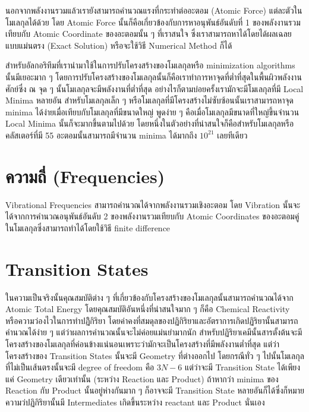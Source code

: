 นอกจากพลังงานรวมแล้วเรายังสามารถคำนวณแรงที่กระทำต่ออะตอม (Atomic Force) แต่ละตัวในโมเลกุลได้ด้วย 
โดย Atomic Force นั้นก็คือเกี่ยวข้องกับการหาอนุพันธ์อันดับที่ 1 ของพลังงานรวมเทียบกับ Atomic Coordinate 
ของอะตอมนั้น ๆ ที่เราสนใจ ซึ่งเราสามารถหาได้โดยได้ผลเฉลยแบบแม่นตรง (Exact Solution) หรือจะใช้วิธี 
Numerical Method ก็ได้

สำหรับอัลกอริทึมที่เรานำมาใช้ในการปรับโครงสร้างของโมเลกุลหรือ minimization algorithms นั้นมีเยอะมาก ๆ 
โดยการปรับโครงสร้างของโมเลกุลนั้นก็คือเราทำการหาจุดที่ต่ำที่สุดในพื้นผิวพลังงานศักย์ซึ่ง 
ณ จุด ๆ นั้นโมเลกุลจะมีพลังงานที่ต่ำที่สุด อย่างไรก็ตามบ่อยครั้งเรามักจะมีโมเลกุลที่มี Local Minima หลายอัน 
สำหรับโมเลกุลเล็ก ๆ หรือโมเลกุลที่มีโครงสร้างไม่ซับซ้อนนั้นเราสามารถหาจุด minima 
ได้ง่ายเมื่อเทียบกับโมเลกุลที่มีขนาดใหญ่ พูดง่าย ๆ คือเมื่อโมเลกุลมีขนาดที่ใหญ่ขึ้นจำนวน Local Minima 
นั้นก็จะมากขึ้นตามไปด้วย โดยหนึ่งในตัวอย่างที่น่าสนใจก็คือสำหรับโมเลกุลหรือคลัสเตอร์ที่มี 55 อะตอมนั้นสามารถมีจำนวน 
minima ได้มากถึง $10^{21}$ เลยทีเดียว

\section{ความถี่ (Frequencies)}

Vibrational Frequencies สามารถคำนวณได้จากพลังงานรวมเชิงอะตอม โดย Vibration 
นั้นจะได้จากการคำนวณอนุพันธ์อันดับ 2 ของพลังงานรวมเทียบกับ Atomic Coordinates 
ของอะตอมคู่ในโมเลกุลซึ่งสามารถทำได้โดยใช้วิธี finite difference 

\section{Transition States}

ในความเป็นจริงนั้นคุณสมบัติต่าง ๆ ที่เกี่ยวข้องกับโครงสร้างของโมเลกุลนั้นสามารถคำนวณได้จาก Atomic Total Energy 
โดยคุณสมบัติอันหนึ่งที่น่าสนใจมาก ๆ ก็คือ Chemical Reactivity หรือความว่องไวในการทำปฏิิกิริยา 
โดยค่าคงที่สมดุลของปฏิกิริยาและอัตราการเกิดปฏิริยานั้นสามารถคำนวณได้ง่าย ๆ แต่ว่าผลการคำนวณนั้นจะไม่ค่อยแม่นยำมากนัก 
สำหรับปฏิริยาเคมีนั้นสารตั้งต้นจะมีโครงสร้างของโมเลกุลที่ค่อนข้างแน่นอนเพราะว่ามักจะเป็นโครงสร้างที่มีพลังงานต่ำที่สุด 
แต่ว่าโครงสร้างของ Transition States นั้นจะมี Geometry ที่ต่างออกไป โดยกรณีทั่ว ๆ ไปนั้นโมเลกุลที่ไม่เป็นเส้นตรงนั้นจะมี 
degree of freedom คือ $3N - 6$ แต่ว่าจะมี Transition State ได้เพียงแค่ Geometry เดียวเท่านั้น 
(ระหว่าง Reaction และ Product) ถ้าหากว่า minima ของ Reaction กับ Product นั้นอยู่ห่างกันมาก ๆ 
ก็อาจจะมี Transition State หลายอันก็ได้ซึ่งก็หมายความว่ปฏิกิริยานั้นมี Intermediates เกิดขึ้นระหว่าง 
reactant และ Product นั่นเอง 


